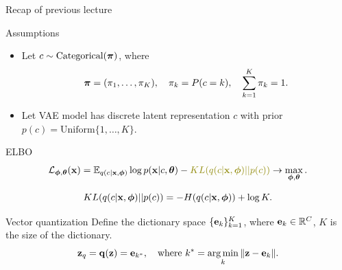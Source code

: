 

\begin{frame}
\titlepage
\end{frame}
\begin{frame}{Recap of previous lecture}
	\begin{block}{Assumptions}
		\begin{itemize}
			\item Let $c \sim \text{Categorical}(\boldsymbol{\pi})$, where 
			\vspace{-0.6cm}
			\[
			\boldsymbol{\pi} = (\pi_1, \dots, \pi_K), \quad \pi_k = P(c = k), \quad \sum_{k=1}^K \pi_k = 1.
			\]
			\vspace{-0.7cm}
			\item Let VAE model has discrete latent representation $c$ with prior $p(c) = \text{Uniform}\{1, \dots, K\}$.
		\end{itemize}
	\end{block}
	\begin{block}{ELBO}
		\vspace{-0.6cm}
		\[
			\cL_{\bphi, \btheta}(\bx)  = \mathbb{E}_{q(c | \bx, \bphi)} \log p(\bx | c, \btheta) - {\color{olive} KL(q(c| \bx, \bphi) || p(c))} \rightarrow \max_{\bphi, \btheta}.
		\]
	\end{block}
	\vspace{-1.0cm}
	\[
		KL(q(c| \mathbf{x}, \boldsymbol{\phi}) || p(c)) = - H(q(c | \mathbf{x}, \boldsymbol{\phi})) + \log K. 
	\]		
	\vspace{-0.5cm}
	\begin{block}{Vector quantization}
		Define the dictionary space $\{\mathbf{e}_k\}_{k=1}^K$, where $\mathbf{e}_k \in \mathbb{R}^C$, $K$ is the size of the dictionary.
		\vspace{-0.3cm}
		\[
		\mathbf{z}_q = \mathbf{q} (\mathbf{z}) = \mathbf{e}_{k^*}, \quad \text{where } k^* = \operatorname*{arg\,min}_k \| \mathbf{z} - \mathbf{e}_k \|.
		\] 
		\vspace{-0.7cm}
	\end{block}
\end{frame}
